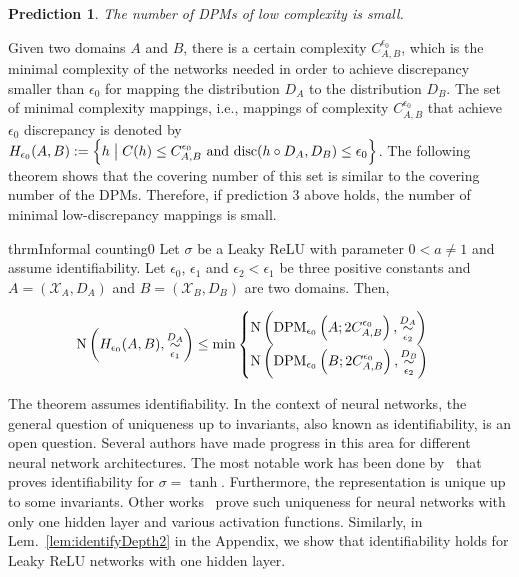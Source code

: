 \documentclass{article} %
\newtheorem{pred}{Prediction}
\newcommand{\disc}{\textnormal{disc}}
\newcommand{\Cov}{\textnormal{N}}
\begin{document}
\begin{pred} The number of DPMs of low complexity is small.
\end{pred}

Given two domains $A$ and $B$, there is a certain complexity $C^{\epsilon_0}_{A,B}$, which  is the minimal complexity of the networks needed in order to achieve discrepancy smaller than $\epsilon_0$ for mapping the distribution $D_A$ to the distribution $D_B$. The set of minimal complexity mappings, i.e., mappings of complexity $C^{\epsilon_0}_{A,B}$ that achieve $\epsilon_0$ discrepancy is denoted by $H_{\epsilon_0}(A,B) := \left\{h \; \big\vert\; C(h) \leq C^{\epsilon_0}_{A,B} \textnormal{ and } \disc(h \circ D_A,D_B) \leq \epsilon_0\right\}$. The following theorem shows that the covering number of this set is similar to the covering number of the DPMs. Therefore, if prediction 3 above holds, the number of minimal low-discrepancy mappings is small. 

\begin{restatable}[Informal]{thrmInformal} {counting0}\label{thm:counting0} Let $\sigma$ be a Leaky ReLU with parameter $0< a \neq 1$ and assume identifiability. Let $\epsilon_0$, $\epsilon_1$ and $\epsilon_2 < \epsilon_1$ be three positive constants and $A = (\mathcal{X}_A,D_A)$ and $B = (\mathcal{X}_B, D_B)$ are two domains. Then, 
\begin{small}
\begin{equation}
\begin{aligned}
\Cov\left(H_{\epsilon_0}(A,B),\overset{D_A}{\underset{\epsilon_1}{\sim}}\right) \leq 
\min \begin{cases}
\Cov\left (\textnormal{DPM}_{\epsilon_0}\left(A; 2C^{\epsilon_0}_{A,B} \right), \overset{D_A}{\underset{\epsilon_2}{\sim}} \right)\\
\Cov\left (\textnormal{DPM}_{\epsilon_0}\left(B; 2C^{\epsilon_0}_{A,B} \right), \overset{D_B}{\underset{\epsilon_2}{\sim}} \right)
\end{cases}
\end{aligned}
\end{equation}
\end{small}
\end{restatable}


The theorem assumes identifiability. In the context of neural networks, the general question of uniqueness up to invariants, also known as identifiability, is an open question. Several authors have made progress in this area for different neural network architectures. The most notable work has been done by~\cite{DBLP:conf/nips/FeffermanM93} that proves identifiability for $\sigma = \tanh$. Furthermore, the representation is unique up to some invariants. Other works~\citep{DBLP:journals/tnn/WilliamsonH95,albertini,DBLP:journals/nn/KurkovaK14,DBLP:journals/nn/Sussmann92} prove such uniqueness for neural networks with only one hidden layer and various activation functions. Similarly, in Lem.~\ref{lem:identifyDepth2} in the Appendix, we show that identifiability holds for Leaky ReLU networks with one hidden layer.
\end{document}
